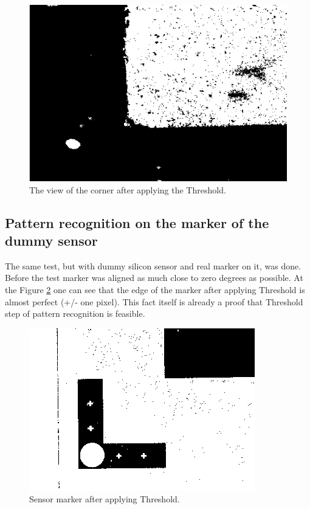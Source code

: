 \begin{figure}[ht]\centering
\includegraphics[width=0.8\linewidth]{Data/Precision_tests/Corner_thresholded.png}
\caption{The view of the corner after applying the Threshold.}
\label{fig:corner_threshold}
\end{figure}

\subsection{Pattern recognition on the marker of the dummy sensor}

The same test, but with dummy silicon sensor and real marker on it, was done. Before the test marker was aligned as much close to zero degrees as possible. At the Figure \ref{fig:thresholded_marker} one can see that the edge of the marker after applying Threshold is almost perfect (+/- one pixel). This fact itself is already a proof that Threshold step of pattern recognition is feasible.

\begin{figure}[ht]\centering
\includegraphics[width=0.6\linewidth]{Data/Precision_tests/Thresholded_marker.png}
\caption{Sensor marker after applying Threshold.}
\label{fig:thresholded_marker}
\end{figure}

